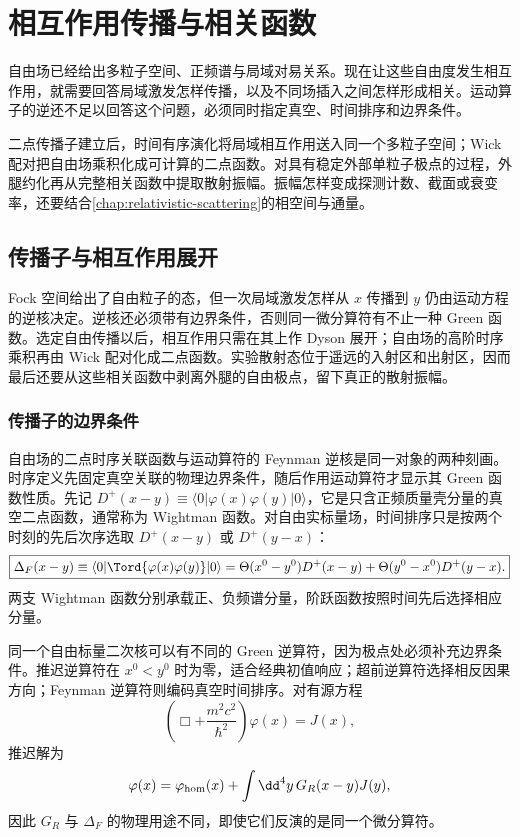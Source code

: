 \chapter{相互作用传播与相关函数}\label{chap:interacting-field-propagation}

自由场已经给出多粒子空间、正频谱与局域对易关系。现在让这些自由度发生相互作用，就需要回答局域激发怎样传播，以及不同场插入之间怎样形成相关。运动算子的逆还不足以回答这个问题，必须同时指定真空、时间排序和边界条件。

二点传播子建立后，时间有序演化将局域相互作用送入同一个多粒子空间；Wick 配对把自由场乘积化成可计算的二点函数。对具有稳定外部单粒子极点的过程，外腿约化再从完整相关函数中提取散射振幅。振幅怎样变成探测计数、截面或衰变率，还要结合\cref{chap:relativistic-scattering}的相空间与通量。

\section{传播子与相互作用展开}

Fock 空间给出了自由粒子的态，但一次局域激发怎样从 $x$ 传播到 $y$ 仍由运动方程的逆核决定。逆核还必须带有边界条件，否则同一微分算符有不止一种 Green 函数。选定自由传播以后，相互作用只需在其上作 Dyson 展开；自由场的高阶时序乘积再由 Wick 配对化成二点函数。实验散射态位于遥远的入射区和出射区，因而最后还要从这些相关函数中剥离外腿的自由极点，留下真正的散射振幅。

\subsection{传播子的边界条件}

自由场的二点时序关联函数与运动算符的 Feynman 逆核是同一对象的两种刻画。时序定义先固定真空关联的物理边界条件，随后作用运动算符才显示其 Green 函数性质。先记
\(D^+(x-y)\equiv\langle0|\varphi(x)\varphi(y)|0\rangle\)，它是只含正频质量壳分量的真空二点函数，通常称为 Wightman 函数。对自由实标量场，时间排序只是按两个时刻的先后次序选取 \(D^+(x-y)\) 或 \(D^+(y-x)\)：
\begin{equation}
\boxed{
\Delta_F(x-y)
\equiv\langle0|\Tord\{\varphi(x)\varphi(y)\}|0\rangle
=\Theta(x^0-y^0)D^+(x-y)+\Theta(y^0-x^0)D^+(y-x).}
\label{eq:feynman-from-wightman-r3}
\end{equation}
两支 Wightman 函数分别承载正、负频谱分量，阶跃函数按照时间先后选择相应分量。

同一个自由标量二次核可以有不同的 Green 逆算符，因为极点处必须补充边界条件。推迟逆算符在 $x^0<y^0$ 时为零，适合经典初值响应；超前逆算符选择相反因果方向；Feynman 逆算符则编码真空时间排序。对有源方程
\begin{equation*}
\left(\Box+\frac{m^2c^2}{\hbar^2}\right)\varphi(x)=J(x),
\end{equation*}
推迟解为
\begin{equation*}
\varphi(x)=\varphi_{\rm hom}(x)+\int\dd^4 y\,G_R(x-y)J(y),
\end{equation*}
因此 $G_R$ 与 $\Delta_F$ 的物理用途不同，即使它们反演的是同一个微分算符。

